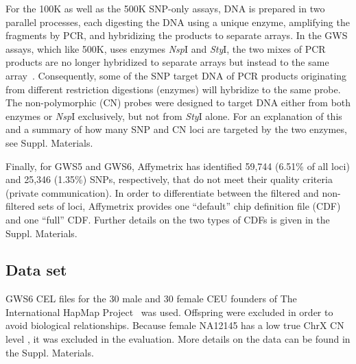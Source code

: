 \documentclass{bioinfo}
\newcommand{\GWSFive}{GWS5\xspace}
\newcommand{\GWSSix}{GWS6\xspace}
\newcommand{\chrX}{ChrX\xspace}
\newcommand{\NspI}{\emph{Nsp}I\xspace}
\newcommand{\StyI}{\emph{Sty}I\xspace}
\begin{document}
For the 100K as well as the 500K SNP-only assays, DNA is prepared in two parallel processes, each digesting the DNA using a unique enzyme, amplifying the fragments by PCR, and hybridizing the products to separate arrays.  In the GWS assays, which like 500K, uses enzymes \NspI and \StyI, the two mixes of PCR products are no longer hybridized to separate arrays but instead to the same array~\citep{Affymetrix_2007f, Affymetrix_2007g}.
Consequently, some of the SNP target DNA of PCR products originating from different restriction digestions (enzymes) will hybridize to the same probe.  
The non-polymorphic (CN) probes were designed to target DNA either from both enzymes or \NspI exclusively, but not from \StyI alone.  
For an explanation of this and a summary of how many SNP and CN loci are targeted by the two enzymes, see Suppl. Materials.


Finally, for \GWSFive and \GWSSix, Affymetrix has identified 59,744 (6.51\% of all loci) and 25,346 (1.35\%) SNPs, respectively, that do not meet their quality criteria (private communication).
In order to differentiate between the filtered and non-filtered sets of loci, Affymetrix provides one ``default'' chip definition file (CDF) and one ``full'' CDF.  Further details on the two types of CDFs is given in the Suppl. Materials.






\subsection{Data set}
\GWSSix CEL files for the 30 male and 30 female CEU founders of The International HapMap Project~\citep{HapMap_2003, AltshulerD_etal_2005} was used. Offspring were excluded in order to avoid biological relationships.
Because female NA12145 has a low true \chrX CN level \citep{TingJ_etal_2006}, it was excluded in the evaluation.  
More details on the data can be found in the Suppl. Materials.
\end{document}
